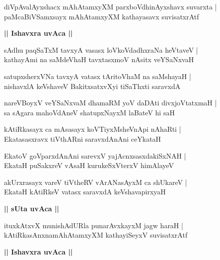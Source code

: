 \documentclass[twoside,12pt,openright]{book}
\newcounter{shloka}[chapter]
\def\uvaca#1{\centerline{{\large\textbf{#1}}}}
\begin{document}
\begin{shloka}%
diVpAvalAyxshacx mAhAtamxyXM parxboVdhinAyxshavx suvarxta |\\
paMcaBiVSamxsayx mAhAtamxyXM kathayasavx suvisatxrAtf 
\end{shloka}

\uvaca{|| Ishavxra uvAca ||}

\begin{shloka}%
sAdhu paqSaTxM tavxyA vasasx loVkoVdadhxraNa heVtaveV |\\
kathayAmi na saMdeVhaH tavxtasxmoV nAsitx veYSaNxvaH 
\end{shloka}

\begin{shloka}%
satupxsherxVNa tavxyA vatasx tAritoVhaM na saMshayaH |\\
nishavxlA keVshaveV BakitxsatxvXyi tiSaThxti saravxdA 
\end{shloka}

\begin{shloka}%
nareVBoyxV veYSaNxvaM dhamaRM yoV daDAti divxjoVtatxmaH |\\
sa sAgara mahoVdAneV shatupxNayxM laBateV hi saH 
\end{shloka}

\begin{shloka}%
kAtiRkasayx ca mAsasayx koVTiyxMsheVnApi nAhaRti |\\
Ekatasasxravx tiVthARni saravxdAnAni ceYkataH 
\end{shloka}

\begin{shloka}%
EkatoV goVparxdAnAni sarevxV yajAcnxsasxdakiSxNAH |\\
EkataH puSakxreV vAsaH kurukeSxVterxV himAlayeV 
\end{shloka}

\begin{shloka}%
akUrxrasayx vareV tiVtheRV vArANasAyxM ca shUkareV |\\
EkataH kAtiRkeV vatasx saravxdA keVshavapirxyaH 
\end{shloka}

\uvaca{|| sUta uvAca ||}

\begin{shloka}%
ituxkAtxvX munishAdURla punarAvxkayxM jagw haraH |\\
kAtiRkasAnxnamAhAtamxyXM kathayiSeyxV suvisatxrAtf
\end{shloka}

\uvaca{|| Ishavxra uvAca ||}
\end{document}
